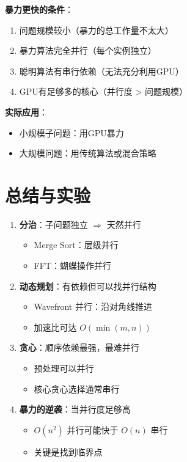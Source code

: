 \documentclass[12pt, a4paper]{ctexart}
\begin{document}
\begin{keypoint}[什么时候暴力能赢]

\textbf{暴力更快的条件}：
\begin{enumerate}
    \item 问题规模较小（暴力的总工作量不太大）
    \item 暴力算法完全并行（每个实例独立）
    \item 聪明算法有串行依赖（无法充分利用GPU）
    \item GPU有足够多的核心（并行度 > 问题规模）
\end{enumerate}

\textbf{实际应用}：
\begin{itemize}
    \item 小规模子问题：用GPU暴力
    \item 大规模问题：用传统算法或混合策略
\end{itemize}

\end{keypoint}

\section{总结与实验}

\begin{keypoint}[本周要点]

\begin{enumerate}
    \item \textbf{分治}：子问题独立 $\Rightarrow$ 天然并行
    \begin{itemize}
        \item Merge Sort：层级并行
        \item FFT：蝴蝶操作并行
    \end{itemize}
    
    \item \textbf{动态规划}：有依赖但可以找并行结构
    \begin{itemize}
        \item Wavefront 并行：沿对角线推进
        \item 加速比可达 $O(\min(m,n))$
    \end{itemize}
    
    \item \textbf{贪心}：顺序依赖最强，最难并行
    \begin{itemize}
        \item 预处理可以并行
        \item 核心贪心选择通常串行
    \end{itemize}
    
    \item \textbf{暴力的逆袭}：当并行度足够高
    \begin{itemize}
        \item $O(n^2)$ 并行可能快于 $O(n)$ 串行
        \item 关键是找到临界点
    \end{itemize}
\end{enumerate}

\end{keypoint}
\end{document}
